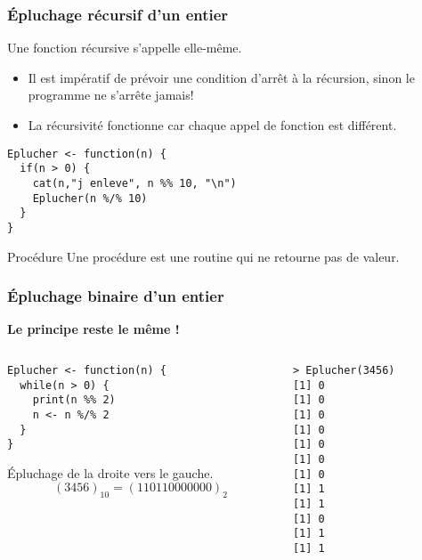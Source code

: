 \documentclass[10pt]{beamer}
\begin{document}
\begin{frame}[fragile]
  \frametitle{Épluchage récursif d'un entier}
  \begin{block}{Une fonction récursive s'appelle elle-même.}
    \begin{itemize}
    \item Il est impératif de prévoir une condition d'arrêt à la récursion, sinon le programme ne s'arrête jamais!
    \item La récursivité fonctionne car chaque appel de fonction est différent.
    \end{itemize}

  \end{block}

  \begin{lstlisting}[style=editor]
Eplucher <- function(n) {
  if(n > 0) {
    cat(n,"j enleve", n %% 10, "\n")
    Eplucher(n %/% 10)
  }
}    
  \end{lstlisting}

  \begin{block}{Procédure}
    Une procédure est une routine qui ne retourne pas de valeur.
  \end{block}

\end{frame}



\begin{frame}[fragile]
  \frametitle{Épluchage  binaire d'un entier}
  \begin{center}
    \alert{\textbf{Le principe reste le même !}}
  \end{center}
 

\begin{columns}[t]
\begin{column}{0.62\textwidth}
\begin{lstlisting}[style=editor]
Eplucher <- function(n) {
  while(n > 0) {
    print(n %% 2)
    n <- n %/% 2
  }
}  
\end{lstlisting}
Épluchage de la droite vers le gauche.
$$
(3456)_{10} = (110110000000)_2
$$

\end{column}
\begin{column}{0.38\textwidth}
  \begin{lstlisting}
> Eplucher(3456)
[1] 0
[1] 0
[1] 0
[1] 0
[1] 0
[1] 0
[1] 0
[1] 1
[1] 1
[1] 0
[1] 1
[1] 1    
\end{lstlisting}
\end{column}
\end{columns}
\end{frame}
\end{document}
